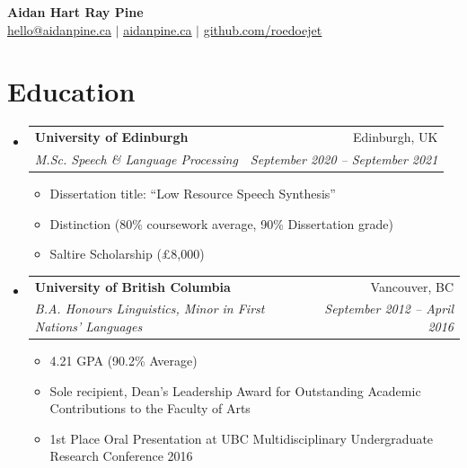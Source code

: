 \documentclass[letterpaper,11pt]{article}
\makeatletter
\newcommand{\resumeItem}[1]{
  \item\small{
    {#1 \vspace{-2pt}}
  }
}
\newcommand{\resumeSubheading}[4]{
  \vspace{-2pt}\item
    \begin{tabular*}{0.97\textwidth}[t]{l@{\extracolsep{\fill}}r}
      \textbf{#1} & #2 \\
      \textit{\small#3} & \textit{\small #4} \\
    \end{tabular*}\vspace{-7pt}
}
\newcommand{\resumeSubHeadingListStart}{\begin{itemize}[leftmargin=0.15in, label={}]}
\newcommand{\resumeSubHeadingListEnd}{\end{itemize}}
\newcommand{\resumeItemListStart}{\begin{itemize}}
\newcommand{\resumeItemListEnd}{\end{itemize}\vspace{-5pt}}
\makeatother
\begin{document}
\begin{center}
    \textbf{\Huge Aidan Hart Ray Pine} \\ \vspace{1pt}
    \href{mailto:hello@aidanpine.ca}{\underline{hello@aidanpine.ca}} $|$
    \href{https://aidanpine.ca}{\underline{aidanpine.ca}} $|$
    \href{https://github.com/roedoejet}{\underline{github.com/roedoejet}}
\end{center}

\section{Education}
  \resumeSubHeadingListStart
    \resumeSubheading
      {University of Edinburgh}{Edinburgh, UK}
      {M.Sc. Speech \& Language Processing}{September 2020 – September 2021}
      \resumeItemListStart
        \resumeItem{Dissertation title: ``Low Resource Speech Synthesis''}
        \resumeItem{Distinction (80\% coursework average, 90\% Dissertation grade)}
        \resumeItem{Saltire Scholarship (£8,000)}
      \resumeItemListEnd
    \resumeSubheading
      {University of British Columbia}{Vancouver, BC}
      {B.A. Honours Linguistics, Minor in First Nations' Languages}{September 2012 – April 2016}
      \resumeItemListStart
        \resumeItem{4.21 GPA (90.2\% Average)}
        \resumeItem{Sole recipient, Dean's Leadership Award for Outstanding Academic Contributions to the Faculty of Arts}
        \resumeItem{1st Place Oral Presentation at UBC Multidisciplinary Undergraduate Research Conference 2016}
      \resumeItemListEnd
  \resumeSubHeadingListEnd

\end{document}
